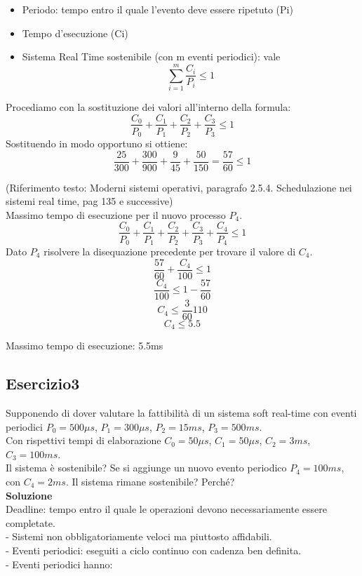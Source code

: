 \documentclass{article}
\begin{document}
\begin{itemize}
\item Periodo: tempo entro il quale l’evento deve essere ripetuto (Pi)
\item Tempo d’esecuzione (Ci)
\item Sistema Real Time sostenibile (con m eventi periodici): vale \[\sum_{i=1}^m \frac{C_i}{P_i} \le 1\]

\end{itemize}

Procediamo con la sostituzione dei valori all’interno della formula:
 \[ \frac{C_0}{P_0}+\frac{C_1}{P_1}+\frac{C_2}{P_2}+\frac{C_3}{P_3} \le 1\]
 Sostituendo in modo opportuno si ottiene:
 \[ \frac{25}{300}+\frac{300}{900}+\frac{9}{45}+\frac{50}{150} = \frac{57}{60} \le 1\]

(Riferimento testo: Moderni sistemi operativi, paragrafo 2.5.4. Schedulazione nei sistemi
real time, pag 135 e successive)\\

Massimo tempo di esecuzione per il nuovo processo $P_{4}$.
 \[ \frac{C_0}{P_0}+\frac{C_1}{P_1}+\frac{C_2}{P_2}+\frac{C_3}{P_3}+\frac{C_4}{P_4} \le 1\]
Dato  $P_{4}$ risolvere la disequazione precedente per trovare il valore di  $C_{4}$.
 \[  \frac{57}{60}+\frac{C_4}{100} \le 1\]
 \[  \frac{C_4}{100} \le 1 - \frac{57}{60}\]
 \[  C_4 \le  \frac{3}{60}  110\]
  \[  C_4 \le  5.5\]

Massimo tempo di esecuzione: 5.5ms\\

\vskip 1.5cm

\subsection{Esercizio3}

Supponendo di dover valutare la fattibilità di un sistema soft real-time con eventi periodici $P_{0}=500 \mu s$, $P_{1}=300 \mu s$, $P_{2}=15 ms$, $P_{3} = 500 ms$.\\
Con rispettivi tempi di elaborazione $C_{0}=50 \mu s$, $C_{1}=50 \mu s$,
$C_{2}=3ms$, $C_{3}=100 ms$.\\
Il sistema è sostenibile? Se si aggiunge un nuovo evento periodico $P_4=100ms$, con $C_4= 2ms$. Il sistema rimane sostenibile? Perché?\\

\vskip 0.5cm
\textbf{Soluzione}\\

Deadline: tempo entro il quale le operazioni devono necessariamente
essere completate.\\
- Sistemi non obbligatoriamente veloci ma piuttosto affidabili.\\
- Eventi periodici: eseguiti a ciclo continuo con cadenza ben definita.\\
- Eventi periodici hanno:
\end{document}
